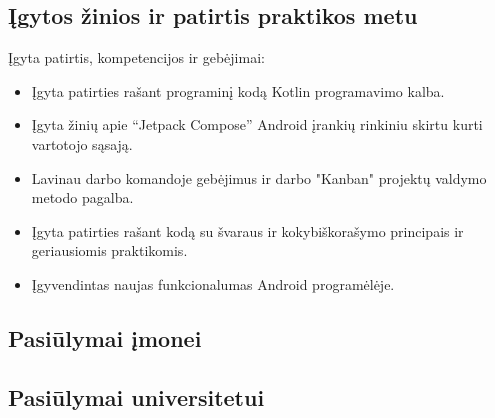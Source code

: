 \documentclass{VUMIFPSPraktika}
\begin{document}
\subsection{Įgytos žinios ir patirtis praktikos metu}
Įgyta patirtis, kompetencijos ir gebėjimai:
\begin{itemize}
    \item Įgyta patirties rašant programinį kodą Kotlin programavimo kalba.
    \item Įgyta žinių apie “Jetpack Compose” Android įrankių rinkiniu skirtu kurti vartotojo sąsają.
    \item Lavinau darbo komandoje gebėjimus ir darbo "Kanban" projektų valdymo metodo pagalba.
    \item Įgyta patirties rašant kodą su švaraus ir kokybiškorašymo principais ir geriausiomis praktikomis. 
    \item Įgyvendintas naujas funkcionalumas Android programėlėje.
\end{itemize}

\subsection{Pasiūlymai įmonei}
\subsection{Pasiūlymai universitetui}
\end{document}
